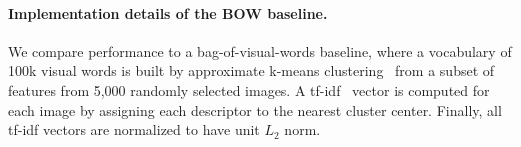 \documentclass[table]{article} %
\begin{document}
    
	    
	   	\paragraph{Implementation details of the BOW baseline.}	
		We compare performance to a bag-of-visual-words baseline, where
	    	a vocabulary of 100k visual words is built by approximate k-means clustering~\cite{Philbin07} from a subset of features from 5,000 randomly selected images. A tf-idf~\cite{Sivic03} vector is computed for each image by assigning each descriptor to the nearest cluster center.  Finally, all tf-idf vectors are normalized to have unit $L_2$ norm.

%
%
\end{document}
